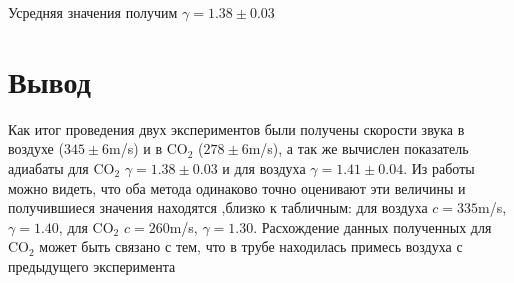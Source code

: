 \documentclass[12pt]{article}
\begin{document}
Усредняя значения получим $\gamma = 1.38 \pm 0.03$

\section{Вывод}

Как итог проведения двух экспериментов были получены скорости звука в воздухе ($345 \pm 6$m/s) и в CO$_2$ ($278\pm 6$m/s), а так же вычислен показатель адиабаты для CO$_2$ $\gamma = 1.38 \pm 0.03$ и для воздуха $\gamma = 1.41 \pm 0.04$. Из работы можно видеть, что оба метода одинаково точно оценивают эти величины и получившиеся значения находятся ,близко к табличным: для воздуха $c = 335$m/s, $\gamma = 1.40$, для CO$_2$ $c = 260$m/s, $\gamma = 1.30$. Расхождение данных полученных для CO$_2$ может быть связано с тем, что в трубе находилась примесь воздуха с предыдущего эксперимента
\end{document}
